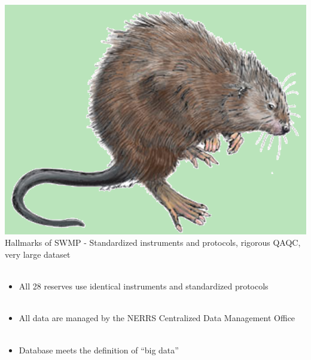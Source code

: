 \documentclass[serif]{beamer}\usepackage[]{graphicx}\usepackage[]{color}
\begin{document}
\begin{frame}{\includegraphics[width=0.05\paperwidth]{fig/muskrat.png}\hspace{0.07in}{\bf What is NERRS/SWMP?}}
Hallmarks of SWMP - Standardized instruments and protocols, rigorous QAQC, very large dataset \\~\\
\begin{itemize}
\item All 28 reserves use identical instruments and standardized protocols \\~\\
\item All data are managed by the NERRS Centralized Data Management Office \\~\\
\item Database meets the definition of ``big data''
\end{itemize}
\end{frame}
\end{document}
